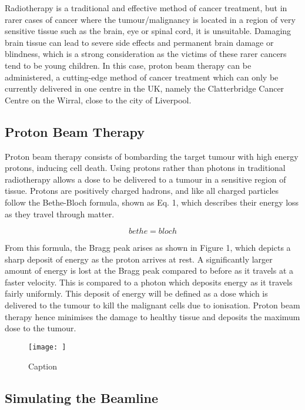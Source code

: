 \documentclass[a4paper, 12pt, conference]
{ieeeconf}      %
\begin{document}
Radiotherapy is a traditional and effective method of cancer treatment, but in rarer cases of cancer where the tumour/malignancy is located in a region of very sensitive tissue such as the brain, eye or spinal cord, it is unsuitable. Damaging brain tissue can lead to severe side effects and permanent brain damage or blindness, which is a strong consideration as the victims of these rarer cancers tend to be young children. In this case, proton beam therapy can be administered, a cutting-edge method of cancer treatment which can only be currently delivered in one centre in the UK, namely the Clatterbridge Cancer Centre on the Wirral, close to the city of Liverpool.

\subsection{Proton Beam Therapy}

Proton beam therapy consists of bombarding the target tumour with high energy protons, inducing cell death. Using protons rather than photons in traditional radiotherapy allows a dose to be delivered to a tumour in a sensitive region of tissue. Protons are positively charged hadrons, and like all charged particles follow the Bethe-Bloch formula, shown as Eq. 1, which describes their energy loss as they travel through matter.

\begin{equation}
bethe = bloch
\end{equation}

From this formula, the Bragg peak arises as shown in Figure 1, which depicts a sharp deposit of energy as the proton arrives at rest. A significantly larger amount of energy is lost at the Bragg peak compared to before as it travels at a faster velocity. This is compared to a photon which deposits energy as it travels fairly uniformly. This deposit of energy will be defined as a dose which is delivered to the tumour to kill the malignant cells due to ionisation. Proton beam therapy hence minimises the damage to healthy tissue and deposits the maximum dose to the tumour.

\begin{figure}
    \centering
    \texttt{[image: ]}
    \caption{Caption}
    \label{fig:my_label}
\end{figure}

\vspace{2cm} %

\subsection{Simulating the Beamline}
\end{document}
